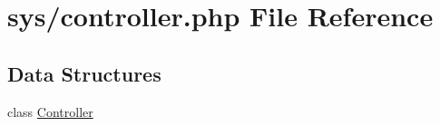 \hypertarget{controller_8php}{}\section{sys/controller.php File Reference}
\label{controller_8php}
\subsection*{Data Structures}
\begin{DoxyCompactItemize}
\item 
class \hyperlink{classController}{Controller}
\end{DoxyCompactItemize}
